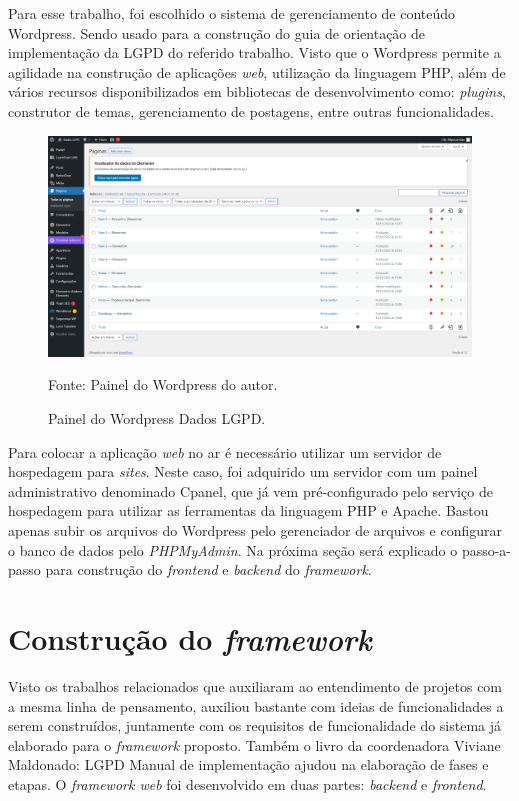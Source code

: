 \documentclass[
	12pt,				%
	openright,			%
	oneside,			%
	a4paper,			%
	english,			%
	french,				%
	spanish,			%
	brazil,				%
	]{abntex2}
\begin{document}
Para esse trabalho, foi escolhido o sistema de gerenciamento de conteúdo  Wordpress. Sendo usado para a construção do guia de orientação de implementação da LGPD do referido trabalho. Visto que o Wordpress permite a agilidade na construção de aplicações \textit{web}, utilização da linguagem PHP, além de vários recursos disponibilizados em bibliotecas de desenvolvimento como: \textit{plugins}, construtor de temas, gerenciamento de postagens, entre outras funcionalidades.

\begin{figure}[ht]
    \centering
    \caption{Painel do Wordpress Dados LGPD.}
    \includegraphics[width=6.0in]{Images/wordpress.png}
    \label{fig: grafico-acc}
    
    \centering \small Fonte: Painel do Wordpress do autor.
\end{figure}

Para colocar a aplicação \textit{web} no ar é necessário utilizar um servidor de hospedagem para \textit{sites}. Neste caso, foi adquirido um servidor com um painel administrativo denominado Cpanel, que já vem pré-configurado pelo serviço de hospedagem para utilizar as ferramentas da linguagem PHP e Apache. Bastou apenas subir os arquivos do Wordpress pelo gerenciador de arquivos  e configurar o banco de dados pelo \textit{PHPMyAdmin}. Na próxima seção será explicado o passo-a-passo para construção do \textit{frontend} e \textit{backend} do \textit{framework}. 
\section{Construção do \textit{framework} }


Visto os trabalhos relacionados que auxiliaram ao entendimento de projetos com a mesma linha de pensamento, auxiliou bastante com ideias de funcionalidades a serem construídos, juntamente com os requisitos de funcionalidade do sistema já elaborado para o \textit{framework} proposto. Também o livro da coordenadora Viviane Maldonado: LGPD Manual de implementação ajudou na elaboração de fases e etapas.
O \textit{framework web} foi desenvolvido em duas partes: \textit{backend} e \textit{frontend}.  
\end{document}
